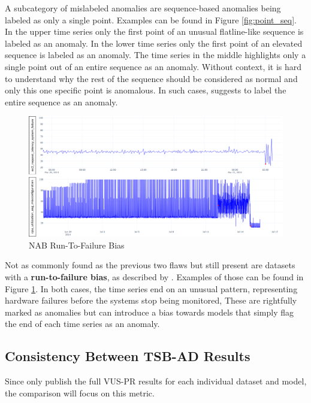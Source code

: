 \documentclass[12pt,oneside]{article}
\begin{document}
A subcategory of mislabeled anomalies are sequence-based anomalies being labeled as only a single point. Examples can be found in Figure \ref{fig:point_seq}. In the upper time series only the first point of an unusual flatline-like sequence is labeled as an anomaly. In the lower time series only the first point of an elevated sequence is labeled as an anomaly. The time series in the middle highlights only a single point out of an entire sequence as an anomaly. Without context, it is hard to understand why the rest of the sequence should be considered as normal and only this one specific point is anomalous. In such cases, \cite[p.~4-5]{wu2021current} suggests to label the entire sequence as an anomaly.

\begin{figure}[htbp] 
    \centering 
    \includegraphics[width=\textwidth]{run_to_failure.png}
    \caption{NAB Run-To-Failure Bias}
    \label{fig:run_to_failure}
\end{figure}

Not as commonly found as the previous two flaws but still present are datasets with a \textbf{run-to-failure bias}, as described by \cite{wu2021current}. Examples of those can be found in Figure \ref{fig:run_to_failure}. In both cases, the time series end on an unusual pattern, representing hardware failures before the systems stop being monitored, These are rightfully marked as anomalies but can introduce a bias towards models that simply flag the end of each time series as an anomaly.

\subsection{Consistency Between TSB-AD Results}

Since \cite{liu2024elephant} only publish the full VUS-PR results for each individual dataset and model, the comparison will focus on this metric.
\end{document}
